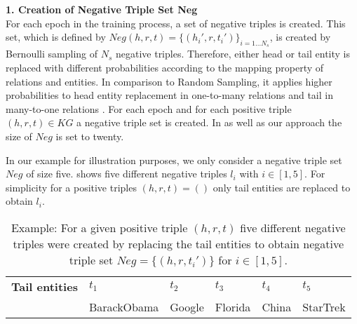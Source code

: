 \textbf{1. Creation of Negative Triple Set Neg}\\
%
For each epoch in the training process, a set of negative triples is created.
This set, which is defined by $Neg(h,r,t)=\{(h_i',r,t_i')\}_{i=1\dots N_s}$, is created by Bernoulli sampling of $N_s$ negative triples.
Therefore, either head or tail entity is replaced with different probabilities according to the mapping property of relations and entities.
In comparison to Random Sampling, it applies higher probabilities to head entity replacement in one-to-many relations and tail in many-to-one relations \cite{qiannegative}.
For each epoch and for each positive triple $(h,r,t) \in KG$ a negative triple set is created.
In \kbgan as well as our approach the size of $Neg$ is set to twenty.

In our example for illustration purposes, we only consider a negative triple set $Neg$ of size five.
 shows five different negative triples $l_i$ with $i \in [1,5]$.
For simplicity for a positive triples $(h,r,t) = (\text{})$
only tail entities are replaced to obtain $l_i$. 
\begin{table}[h]
    \centering
    \begin{tabular}{llllll}
        \toprule
        
        \textbf{Tail entities}
        & \textbf{$t_1$} & \textbf{$t_2$} & \textbf{$t_3$} & \textbf{$t_4$} & \textbf{$t_5$} \\
        
        & BarackObama 
        & Google  
        & Florida 
        & China 
        & StarTrek\\

        \bottomrule
    \end{tabular}
    \caption{Example: For a given positive triple $(h,r,t)$ five different negative triples were created by replacing the tail entities to obtain negative triple set 
    $Neg = \{(h,r,t_i')\}$ for $i \in [1,5]$.}
\label{tab:neg_example}
\end{table}